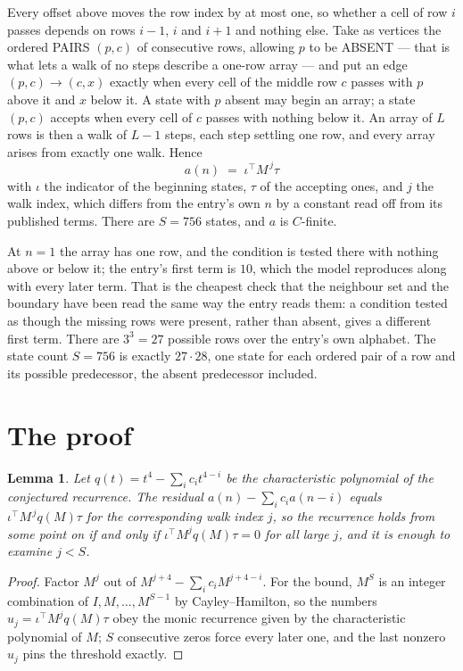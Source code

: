 \documentclass[11pt,a4paper]{article}
\theoremstyle{plain}
\newtheorem{lemma}[theorem]{Lemma}
\theoremstyle{definition}
\begin{document}
Every offset above moves the row index by at most one, so whether a cell of row $i$ passes
depends on rows $i-1$, $i$ and $i+1$ and nothing else. Take as vertices the ordered PAIRS
$(p,c)$ of consecutive rows, allowing $p$ to be ABSENT --- that is what lets a walk of no steps
describe a one-row array --- and put an edge $(p,c)\to(c,x)$ exactly when every cell of the
middle row $c$ passes with $p$ above it and $x$ below it. A state with $p$ absent may begin an
array; a state $(p,c)$ accepts when every cell of $c$ passes with nothing below it. An array of
$L$ rows is then a walk of $L-1$ steps, each step settling one row, and every array arises from
exactly one walk. Hence
\[
a(n)\;=\;\iota^{\!\top}M^{\,j}\tau
\]
with $\iota$ the indicator of the beginning states, $\tau$ of the accepting ones, and $j$ the
walk index, which differs from the entry's own $n$ by a constant read off from its published
terms. There are $S=756$ states, and $a$ is $C$-finite.

At $n=1$ the array has one row, and
the condition is tested there with nothing above or below it; the entry's first term is
$10$, which the model reproduces along with every later term. That is the cheapest check
that the neighbour set and the boundary have been read the same way the entry reads them: a
condition tested as though the missing rows were present, rather than absent, gives a different
first term. There are $3^{3}=27$ possible rows over the entry's own alphabet. The state count $S=756$ is exactly $27\cdot28$,
one state for each ordered pair of a row and its possible predecessor, the absent predecessor
included.

\section{The proof}

\begin{lemma}\label{lem:crit}
Let $q(t)=t^{4}-\sum_i c_it^{4-i}$ be the characteristic polynomial of the
conjectured recurrence. The residual $a(n)-\sum_ic_ia(n-i)$ equals
$\iota^{\!\top}M^{\,j}q(M)\tau$ for the corresponding walk index $j$, so the recurrence
holds from some point on if and only if $\iota^{\!\top}M^{j}q(M)\tau=0$ for all large $j$,
and it is enough to examine $j<S$.
\end{lemma}

\begin{proof}
Factor $M^{j}$ out of $M^{j+4}-\sum_ic_iM^{j+4-i}$. For the bound, $M^{S}$
is an integer combination of $I,M,\dots,M^{S-1}$ by Cayley--Hamilton, so the numbers
$u_j=\iota^{\!\top}M^{j}q(M)\tau$ obey the monic recurrence given by the characteristic
polynomial of $M$; $S$ consecutive zeros force every later one, and the last nonzero $u_j$
pins the threshold exactly.
\end{proof}
\end{document}
